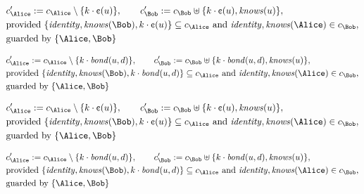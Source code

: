 \begin{align*}
&
c'_
{
\Alice
}
 := 
c_
{
\Alice
}
 \setminus 
\{
k
\cdot
\text{\textcent}
(
u
)
\}
, \qquad 
c'_
{
\Bob
}
 := 
c_
{
\Bob
}
 \uplus 
\{
k
\cdot
\text{\textcent}
(
u
)
,
\mathit{
knows
}
(
u
)
\}
,\\
&
\text{provided } 
\{
\mathit{
identity
}
,
\mathit{
knows
}
(
\Bob
)
,
k
\cdot
\text{\textcent}
(
u
)
\}
 \subseteq c_
{
\Alice
}
 \text{ and } 
\mathit{
identity
}
,
\mathit{
knows
}
(
\Alice
)
 \in c_
{
\Bob
}
,\\
&
\text{guarded by } \{
\Alice
,
\Bob
\}
\end{align*}

\begin{align*}
&
c'_
{
\Alice
}
 := 
c_
{
\Alice
}
 \setminus 
\{
k
\cdot
\mathit{
bond
}
(
u
,
d
)
\}
, \qquad 
c'_
{
\Bob
}
 := 
c_
{
\Bob
}
 \uplus 
\{
k
\cdot
\mathit{
bond
}
(
u
,
d
)
,
\mathit{
knows
}
(
u
)
\}
,\\
&
\text{provided } 
\{
\mathit{
identity
}
,
\mathit{
knows
}
(
\Bob
)
,
k
\cdot
\mathit{
bond
}
(
u
,
d
)
\}
 \subseteq c_
{
\Alice
}
 \text{ and } 
\mathit{
identity
}
,
\mathit{
knows
}
(
\Alice
)
 \in c_
{
\Bob
}
,\\
&
\text{guarded by } \{
\Alice
,
\Bob
\}
\end{align*}

\begin{align*}
&
c'_
{
\Alice
}
 := 
c_
{
\Alice
}
 \setminus 
\{
k
\cdot
\text{\textcent}
(
u
)
\}
, \qquad 
c'_
{
\Bob
}
 := 
c_
{
\Bob
}
 \uplus 
\{
k
\cdot
\text{\textcent}
(
u
)
,
\mathit{
knows
}
(
u
)
\}
,\\
&
\text{provided } 
\{
\mathit{
identity
}
,
\mathit{
knows
}
(
\Bob
)
,
k
\cdot
\text{\textcent}
(
u
)
\}
 \subseteq c_
{
\Alice
}
 \text{ and } 
\mathit{
identity
}
,
\mathit{
knows
}
(
\Alice
)
 \in c_
{
\Bob
}
,\\
&
\text{guarded by } \{
\Alice
,
\Bob
\}
\end{align*}

\begin{align*}
&
c'_
{
\Alice
}
 := 
c_
{
\Alice
}
 \setminus 
\{
k
\cdot
\mathit{
bond
}
(
u
,
d
)
\}
, \qquad 
c'_
{
\Bob
}
 := 
c_
{
\Bob
}
 \uplus 
\{
k
\cdot
\mathit{
bond
}
(
u
,
d
)
,
\mathit{
knows
}
(
u
)
\}
,\\
&
\text{provided } 
\{
\mathit{
identity
}
,
\mathit{
knows
}
(
\Bob
)
,
k
\cdot
\mathit{
bond
}
(
u
,
d
)
\}
 \subseteq c_
{
\Alice
}
 \text{ and } 
\mathit{
identity
}
,
\mathit{
knows
}
(
\Alice
)
 \in c_
{
\Bob
}
,\\
&
\text{guarded by } \{
\Alice
,
\Bob
\}
\end{align*}
